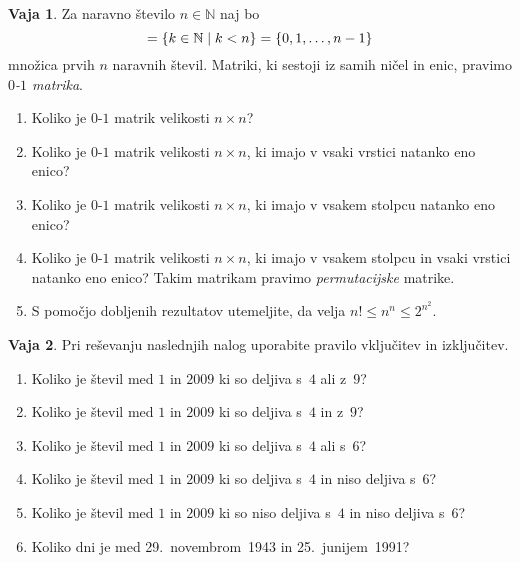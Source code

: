 \documentclass{article}
\newcommand{\NN}{\mathbb{N}}
\theoremstyle{definition}
\newtheorem{vaja}{Vaja}
\begin{document}
\begin{vaja}
  Za naravno število $n \in \NN$ naj bo
  \begin{equation*}
    [n] = \set{k \in \NN}{k < n} = \set{0, 1, \ldots, n-1}
  \end{equation*}
  množica prvih $n$ naravnih števil.
  Matriki, ki sestoji iz samih ničel in enic, pravimo \emph{$0$-$1$ matrika}.
  \begin{enumerate}
    \item
      Koliko je $0$-$1$ matrik velikosti $n \times n$?
    \item
      Koliko je $0$-$1$ matrik velikosti $n \times n$, ki imajo v vsaki vrstici natanko eno enico?
    \item
      Koliko je $0$-$1$ matrik velikosti $n \times n$, ki imajo v vsakem stolpcu natanko eno enico?
    \item
      Koliko je $0$-$1$ matrik velikosti $n \times n$, ki imajo v vsakem stolpcu in vsaki vrstici natanko eno enico? Takim matrikam pravimo \emph{permutacijske} matrike.
    \item
      S pomočjo dobljenih rezultatov utemeljite, da velja $n! \leq n^n \leq 2^{n^2}$.
  \end{enumerate}
\end{vaja}

\begin{vaja}
  Pri reševanju naslednjih nalog uporabite pravilo vključitev in izključitev.
  \begin{enumerate}
    \item
      Koliko je števil med $1$ in $2009$ ki so deljiva s~$4$ ali z~$9$?
    \item
      Koliko je števil med $1$ in $2009$ ki so deljiva s~$4$ in z~$9$?
    \item
      Koliko je števil med $1$ in $2009$ ki so deljiva s~$4$ ali s~$6$?
    \item
      Koliko je števil med $1$ in $2009$ ki so deljiva s~$4$ in niso deljiva s~$6$?
    \item
      Koliko je števil med $1$ in $2009$ ki so niso deljiva s~$4$ in niso deljiva s~$6$?
    \item
      Koliko dni je med 29.~novembrom~1943 in 25.~junijem~1991?
  \end{enumerate}
\end{vaja}
\end{document}
